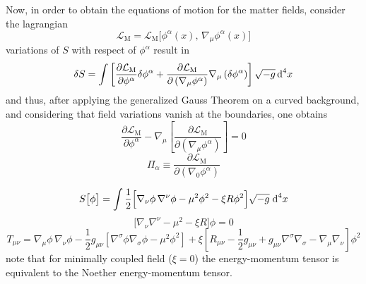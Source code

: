 Now, in order to obtain the equations of motion for the matter fields, consider the lagrangian
\begin{equation}
	\mathcal{L}_{\text{M}}=\mathcal{L}_{\text{M}}\big[\phi^\alpha(x),\,\nabla_\mu\phi^\alpha(x)\big]
\end{equation}
variations of $S$ with respect of $\phi^\alpha$ result in
\begin{equation}
	\delta S=\int\left[\frac{\partial \mathcal{L}_\text{M}}{\partial \phi^\alpha}\delta\phi^\alpha+\frac{\partial \mathcal{L}_\text{M}}{\partial\left(\nabla_\mu\phi^\alpha\right)}\nabla_\mu\left(\delta\phi^\alpha\right)\right]\sqrt{-g}\,\text{d}^4x
\end{equation}
and thus, after applying the generalized Gauss Theorem on a curved background, and considering that field variations vanish at the boundaries, one obtains
\begin{equation}
	\frac{\partial \mathcal{L}_\text{M}}{\partial \phi^\alpha}-\nabla_\mu\left[\frac{\partial \mathcal{L}_\text{M}}{\partial\left(\nabla_\mu\phi^\alpha\right)}\right]=0
\end{equation}
\begin{equation}
	\Pi_\alpha\equiv \frac{\partial\mathcal{L}_\text{M}}{\partial\left(\nabla_0\phi^\alpha\right)}
\end{equation}

\begin{equation}
	S\big[\phi\big]=\int\frac{1}{2}\Big[\nabla_\nu\phi\,\nabla^\nu\phi-\mu^2\phi^2-\xi R\phi^2\Big]\sqrt{-g}\;\text{d}^4 x
\end{equation}
\begin{equation}
	\big[\nabla_\nu\nabla^\nu-\mu^2-\xi R\big]\phi=0
\end{equation}
\begin{equation}
	T_{\mu\nu}=\nabla_\mu\phi\,\nabla_\nu\phi -\frac{1}{2}g_{\mu\nu}\left[\nabla^\sigma\phi\nabla_\sigma\phi-\mu^2\phi^2\right]+\xi\left[R_{\mu\nu}-\frac{1}{2}g_{\mu\nu}+g_{\mu\nu}\nabla^\sigma\nabla_\sigma-\nabla_\mu\nabla_\nu\right]\phi^2
\end{equation}
note that for minimally coupled field ($\xi=0$) the energy-momentum tensor is equivalent to the Noether energy-momentum tensor.